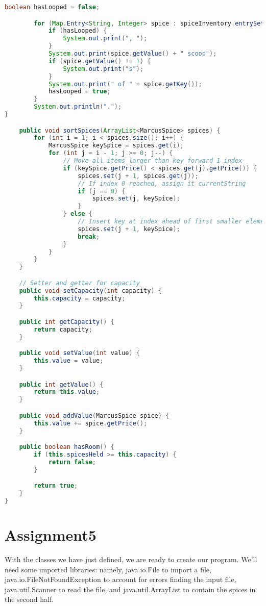 \documentclass[letterpaper, 10pt]{article}
\begin{document}
\begin{lstlisting}[language=Java, firstnumber=1]
        boolean hasLooped = false;

        for (Map.Entry<String, Integer> spice : spiceInventory.entrySet()) {
            if (hasLooped) {
                System.out.print(", ");
            }
            System.out.print(spice.getValue() + " scoop");
            if (spice.getValue() != 1) {
                System.out.print("s");
            }
            System.out.print(" of " + spice.getKey());
            hasLooped = true;
        }
        System.out.println(".");
}

    public void sortSpices(ArrayList<MarcusSpice> spices) {
        for (int i = 1; i < spices.size(); i++) {
            MarcusSpice keySpice = spices.get(i);
            for (int j = i - 1; j >= 0; j--) {
                // Move all items larger than key forward 1 index
                if (keySpice.getPrice() < spices.get(j).getPrice()) {
                    spices.set(j + 1, spices.get(j));
                    // If index 0 reached, assign it currentString
                    if (j == 0) {
                        spices.set(j, keySpice);
                    }
                } else {
                    // Insert key at index ahead of first smaller element
                    spices.set(j + 1, keySpice);
                    break;
                }
            }
        }
    }

    // Setter and getter for capacity
    public void setCapacity(int capacity) {
        this.capacity = capacity;
    }

    public int getCapacity() {
        return capacity;
    }

    public void setValue(int value) {
        this.value = value;
    }

    public int getValue() {
        return this.value;
    }

    public void addValue(MarcusSpice spice) {
        this.value += spice.getPrice();
    }

    public boolean hasRoom() {
        if (this.spicesHeld >= this.capacity) {
            return false;
        }

        return true;
    }
}
\end{lstlisting}

\section{Assignment5}

\hspace{1.0em}With the classes we have just defined, we are ready to create our program. We'll need some imported libraries: namely, java.io.File to import a file, java.io.FileNotFoundException to account for errors finding the input file, java.util.Scanner to read the file, and java.util.ArrayList to contain the spices in the second half.
\end{document}
